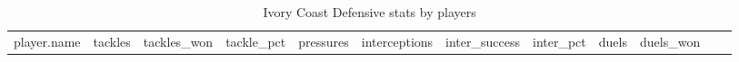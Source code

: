 \documentclass[
  11pt,
  letterpaper,
  DIV=11,
  numbers=noendperiod]{scrartcl}
\begin{document}
\begin{longtable}[]{@{}
  >{\raggedright\arraybackslash}p{}
  >{\raggedleft\arraybackslash}p{}
  >{\raggedleft\arraybackslash}p{}
  >{\raggedleft\arraybackslash}p{}
  >{\raggedleft\arraybackslash}p{}
  >{\raggedleft\arraybackslash}p{}
  >{\raggedleft\arraybackslash}p{}
  >{\raggedleft\arraybackslash}p{}
  >{\raggedleft\arraybackslash}p{}
  >{\raggedleft\arraybackslash}p{}
  >{\raggedleft\arraybackslash}p{}
  >{\raggedleft\arraybackslash}p{}@{}}
\caption{Ivory Coast Defensive stats by players}\tabularnewline
\toprule\noalign{}
\begin{minipage}[b]{\linewidth}\raggedright
player.name
\end{minipage} & \begin{minipage}[b]{\linewidth}\raggedleft
tackles
\end{minipage} & \begin{minipage}[b]{\linewidth}\raggedleft
tackles\_won
\end{minipage} & \begin{minipage}[b]{\linewidth}\raggedleft
tackle\_pct
\end{minipage} & \begin{minipage}[b]{\linewidth}\raggedleft
pressures
\end{minipage} & \begin{minipage}[b]{\linewidth}\raggedleft
interceptions
\end{minipage} & \begin{minipage}[b]{\linewidth}\raggedleft
inter\_success
\end{minipage} & \begin{minipage}[b]{\linewidth}\raggedleft
inter\_pct
\end{minipage} & \begin{minipage}[b]{\linewidth}\raggedleft
duels
\end{minipage} & \begin{minipage}[b]{\linewidth}\raggedleft
duels\_won
\end{minipage} & \begin{minipage}[b]{\linewidth}\raggedleft

\end{minipage}
\end{longtable}
\end{document}
